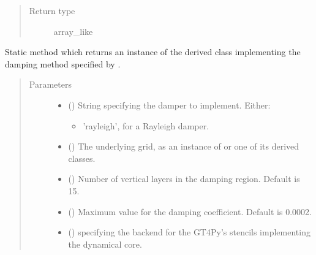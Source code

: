 \documentclass[letterpaper,10pt,english]{sphinxmanual}
\begin{document}
\begin{fulllineitems}
\begin{fulllineitems}
\begin{quote}
\begin{description}
\item[{Return type}] \leavevmode
array\_like

\end{description}\end{quote}

\end{fulllineitems}


\begin{fulllineitems}
\label{\detokenize{api:dycore.vertical_damping.VerticalDamping.factory}}
Static method which returns an instance of the derived class implementing the damping method
specified by .
\begin{quote}\begin{description}
\item[{Parameters}] \leavevmode\begin{itemize}
\item {} 
 () \textendash{} 
String specifying the damper to implement. Either:
\begin{itemize}
\item {} 
’rayleigh’, for a Rayleigh damper.

\end{itemize}


\item {} 
 () \textendash{} The underlying grid, as an instance of {\hyperref[\detokenize{api:grids.grid_xyz.GridXYZ}]{}} or one of its derived classes.

\item {} 
 () \textendash{} Number of vertical layers in the damping region. Default is 15.

\item {} 
 () \textendash{} Maximum value for the damping coefficient. Default is 0.0002.

\item {} 
 () \textendash{}  specifying the backend for the GT4Py’s stencils implementing the dynamical core.


\end{itemize}
\end{description}
\end{quote}
\end{fulllineitems}
\end{fulllineitems}
\end{document}
